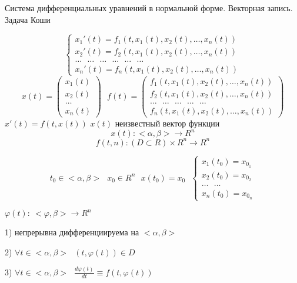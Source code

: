 \begin{title}[\Large]
  Система дифференциальных уравнений в нормальной форме. Векторная запись.
  Задача Коши
\end{title}

\begin{define}
  $$
  \left\{
  \begin{array}{l}
    x_1'(t) = f_1(t, x_1(t), x_2(t), \ldots, x_n(t)) \\
    x_2'(t) = f_2(t, x_1(t), x_2(t), \ldots, x_n(t)) \\
    \ldots ~~~ \ldots ~~~ \ldots ~~~ \ldots ~~~ \ldots ~~~ \ldots \\
    x_n'(t) = f_n(t, x_1(t), x_2(t), \ldots, x_n(t))
  \end{array}
  \right.
  $$
  $$
  x(t) =
  \left(
  \begin{array}{l}
    x_1(t) \\
    x_2(t) \\
    \ldots \\
    x_n(t)
  \end{array}
  \right) ~~~
  f(t) =
  \left(
  \begin{array}{l}
   f_1(t, x_1(t), x_2(t), \ldots, x_n(t)) \\
   f_2(t, x_1(t), x_2(t), \ldots, x_n(t)) \\
    \ldots ~~~ \ldots ~~~ \ldots ~~~ \ldots ~~~ \ldots \\
   f_n(t, x_1(t), x_2(t), \ldots, x_n(t))
  \end{array}
  \right)
  $$
  $x'(t) = f(t, x(t))$ $x(t)$ неизвестный вектор функции
  $$
  x(t):<\alpha, \beta> \to R^n
  $$
  $$
  f(t, n): (D \subset R) \times R^n \to R^n
  $$
\end{define}

\begin{block}
  $$
  t_0 \in <\alpha, \beta> ~~~ x_0 \in R^n ~~~ x(t_0) = x_0 ~~~
  \left\{
  \begin{array}{l}
    x_1(t_0) = x_{0_1} \\
    x_2(t_0) = x_{0_2} \\
    \ldots ~~~ \ldots \\
    x_n(t_0) = x_{0_n}
  \end{array}
  \right.
  $$
\end{block}

\begin{block}
  $\varphi(t): ~ <\varphi, \beta> \to R^n$

  1) непрерывна дифференциируема на $<\alpha, \beta>$

  2) $\forall t \in <\alpha, \beta> ~~~ (t, \varphi(t)) \in D$

  3) $\forall t \in <\alpha, \beta> ~~~ \frac{d\varphi(t)}{dt} \equiv
  f(t, \varphi(t))$
\end{block}


